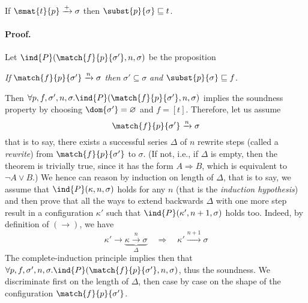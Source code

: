 
\begin{theorem}[Soundness]\hfill
\label{f0:soundness}
\begin{center}
If \(\smat{t}{p} \xrightarrow{+} \sigma\) 
then \(\subst{p}{\sigma} \sqsubseteq t\).
\end{center}
\end{theorem}

\paragraph{Proof.}

Let \(\ind{P}(\match{f}{p}{\sigma'}, n, \sigma)\) be the proposition
\begin{center}
\emph{If} \(\match{f}{p}{\sigma'} \xrightarrow{n} \sigma\)
\emph{then} \(\sigma' \subseteq \sigma\)
\emph{and} \(\subst{p}{\sigma} \sqsubseteq f\).
\end{center}
Then \(\forall p, f, \sigma', n, \sigma.\ind{P}(\match{f}{p}{\sigma'},
n, \sigma)\) implies the soundness property by choosing
\(\dom{\sigma'} = \varnothing\) and \(f = [t]\). Therefore, let us
assume
\begin{equation}
\match{f}{p}{\sigma'} \xrightarrow{n} \sigma \label{f0:sound:n}
\end{equation}
that is to say, there exists a successful series \(\Delta\) of \(n\)
rewrite steps (called a \emph{rewrite}) from \(\match{f}{p}{\sigma'}\)
to \(\sigma\). (If not, i.e., if \(\Delta\) is empty, then the theorem
is trivially true, since it has the form \(A \Rightarrow B\), which is
equivalent to \(\neg{A} \vee B\).) We hence can reason by induction on
length of \(\Delta\), that is to say, we assume that \(\ind{P}(\kappa,
n, \sigma)\) holds for any \(n\) (that is the \emph{induction
  hypothesis}) and then prove that all the ways to extend backwards
\(\Delta\) with one more step result in a configuration \(\kappa'\)
such that \(\ind{P}(\kappa', n+1, \sigma)\) holds too. Indeed, by
definition of \((\rightarrow)\), we have
\[
\kappa' \rightarrow \underbrace{\kappa \xrightarrow{n} \sigma}_{\Delta}
\quad \Longrightarrow \quad
\kappa' \xrightarrow{n+1} \sigma
\]
The complete\hyp{}induction principle implies then that \(\forall p,
f, \sigma', n, \sigma.\ind{P}(\match{f}{p}{\sigma'}, n, \sigma)\),
thus the soundness. We discriminate first on the length of \(\Delta\),
then case by case on the shape of the configuration
\(\match{f}{p}{\sigma'}\).
